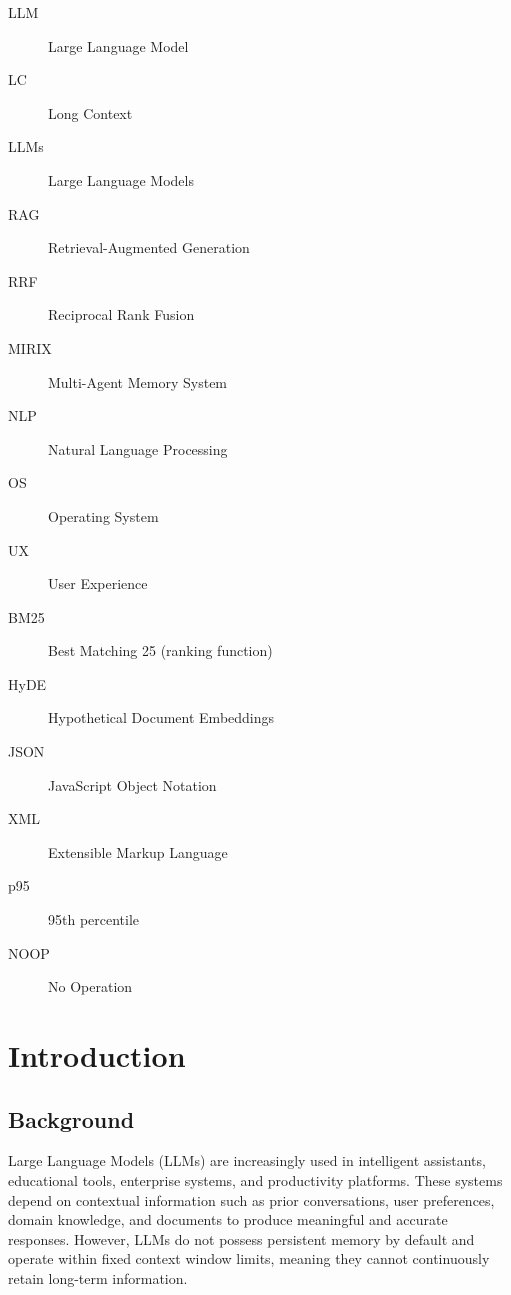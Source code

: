 \documentclass[12pt,a4paper]{article}
\begin{document}
\begin{description}

    \item[LLM] Large Language Model
    \item[LC] Long Context
    \item[LLMs] Large Language Models

    \item[RAG] Retrieval-Augmented Generation
    \item[RRF] Reciprocal Rank Fusion

    \item[MIRIX] Multi-Agent Memory System

    \item[NLP] Natural Language Processing

    \item[OS] Operating System

    \item[UX] User Experience

    \item[BM25] Best Matching 25 (ranking function)

    \item[HyDE] Hypothetical Document Embeddings

    \item[JSON] JavaScript Object Notation

    \item[XML] Extensible Markup Language

    \item[p95] 95th percentile
    \item[NOOP] No Operation
\end{description}
\clearpage

\clearpage
{}
\setcounter{page}{1}


\section{Introduction}

\subsection{Background}

Large Language Models (LLMs) are increasingly used in intelligent assistants, educational tools, enterprise systems, and productivity platforms. These systems depend on contextual information such as prior conversations, user preferences, domain knowledge, and documents to produce meaningful and accurate responses. However, LLMs do not possess persistent memory by default and operate within fixed context window limits, meaning they cannot continuously retain long-term information.
\end{document}
